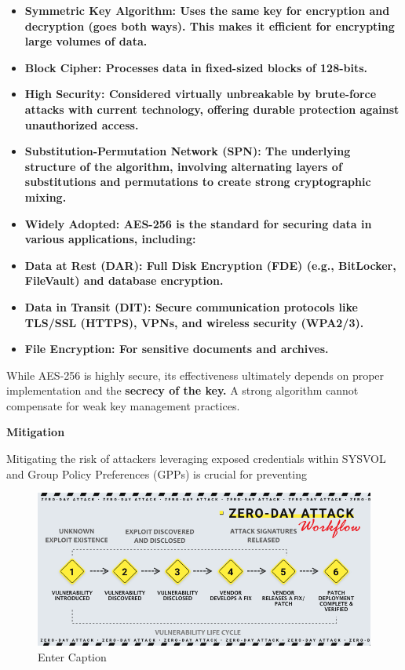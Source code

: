 \begin{itemize}
    \item \textbf{\textbf{Symmetric Key Algorithm: }Uses the same key for encryption and decryption (goes both ways). This makes it efficient for encrypting large volumes of data.}
    \item \textbf{\textbf{Block Cipher: }Processes data in fixed-sized blocks of 128-bits.}
    \item \textbf{\textbf{High Security: }Considered virtually unbreakable by brute-force attacks with current technology, offering durable protection against unauthorized access.}
    \item \textbf{\textbf{Substitution-Permutation Network (SPN): }The underlying structure of the algorithm, involving alternating layers of substitutions and permutations to create strong cryptographic mixing.}
    \item \textbf{\textbf{Widely Adopted: }AES-256 is the standard for securing data in various applications, including:}
\end{itemize}

\begin{itemize}
    \item \textbf{\textbf{Data at Rest (DAR): }Full Disk Encryption (FDE) (e.g., BitLocker, FileVault) and database encryption.}
    \item \textbf{\textbf{Data in Transit (DIT): }Secure communication protocols like TLS/SSL (HTTPS), VPNs, and wireless security (WPA2/3).}
    \item \textbf{\textbf{File Encryption: }For sensitive documents and archives.}
\end{itemize}

While AES-256 is highly secure, its effectiveness ultimately depends on proper implementation and the \textbf{secrecy of the key. }A strong algorithm cannot compensate for weak key management practices.

\textbf{Mitigation}

Mitigating the risk of attackers leveraging exposed credentials within SYSVOL and Group Policy Preferences (GPPs) is crucial for preventing
\begin{figure}[htbp]
    \centering
    \includegraphics[width=\linewidth]{image.png}
    \caption{Enter Caption}
    \label{fig:image}
\end{figure}

